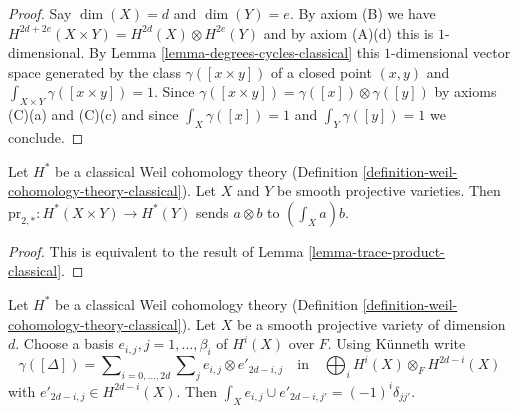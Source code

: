 \begin{proof}
Say $\dim(X) = d$ and $\dim(Y) = e$. By axiom (B) we have
$H^{2d + 2e}(X \times Y) = H^{2d}(X) \otimes H^{2e}(Y)$
and by axiom (A)(d) this is $1$-dimensional.
By Lemma \ref{lemma-degrees-cycles-classical}
this $1$-dimensional vector space generated by the
class $\gamma([x \times y])$ of a closed point $(x, y)$ and
$\int_{X \times Y} \gamma([x \times y]) = 1$.
Since $\gamma([x \times y]) = \gamma([x]) \otimes \gamma([y])$
by axioms (C)(a) and (C)(c) and since $\int_X \gamma([x]) = 1$ and
$\int_Y \gamma([y]) = 1$ we conclude.
\end{proof}

\begin{lemma}
\label{lemma-pr2star-classical}
Let $H^*$ be a classical Weil cohomology theory
(Definition \ref{definition-weil-cohomology-theory-classical}).
Let $X$ and $Y$ be smooth projective varieties.
Then $\text{pr}_{2, *} : H^*(X \times Y) \to H^*(Y)$
sends $a \otimes b$ to $(\int_X a) b$.
\end{lemma}

\begin{proof}
This is equivalent to the result of Lemma \ref{lemma-trace-product-classical}.
\end{proof}

\begin{lemma}
\label{lemma-class-diagonal-classical}
Let $H^*$ be a classical Weil cohomology theory
(Definition \ref{definition-weil-cohomology-theory-classical}).
Let $X$ be a smooth projective variety of dimension $d$.
Choose a basis $e_{i, j}, j = 1, \ldots, \beta_i$ of $H^i(X)$ over $F$.
Using K\"unneth write
$$
\gamma([\Delta]) =
\sum\nolimits_{i = 0, \ldots, 2d}
\sum\nolimits_j e_{i, j} \otimes e'_{2d - i , j}
\quad\text{in}\quad
\bigoplus\nolimits_i H^i(X) \otimes_F H^{2d - i}(X)
$$
with $e'_{2d - i, j} \in H^{2d - i}(X)$.
Then $\int_X e_{i, j} \cup e'_{2d - i, j'} = (-1)^i\delta_{jj'}$.
\end{lemma}

